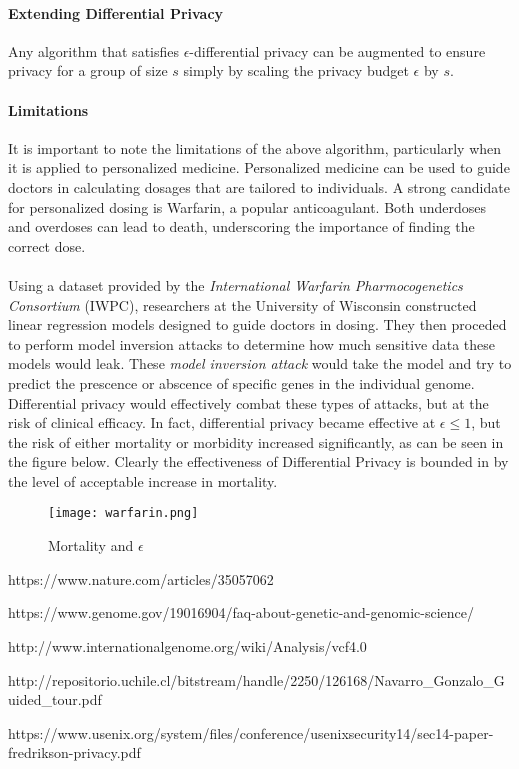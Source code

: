 \paragraph{Extending Differential Privacy}
Any algorithm that satisfies $\epsilon$-differential privacy can be augmented to ensure privacy for a group of size $s$ simply by scaling the privacy budget $\epsilon$ by $s$.

\paragraph{Limitations}

It is important to note the limitations of the above algorithm, particularly when it is applied to personalized medicine. Personalized medicine can be used to guide doctors in calculating dosages that are tailored to individuals. A strong candidate for personalized dosing is Warfarin, a popular anticoagulant. Both underdoses and overdoses can lead to death, underscoring the importance of finding the correct dose.

\paragraph{}
Using a dataset provided by the \textit{International Warfarin Pharmocogenetics Consortium} (IWPC), researchers at the University of Wisconsin constructed linear regression models designed to guide doctors in dosing. They then proceded to perform model inversion attacks to determine how much sensitive data these models would leak. These \textit{model inversion attack} would take the model and try to predict the prescence or abscence of specific genes in the individual genome. Differential privacy would effectively combat these types of attacks, but at the risk of clinical efficacy. In fact, differential privacy became effective at $\epsilon \leq 1$, but the risk of either mortality or morbidity increased significantly, as can be seen in the figure below. Clearly the effectiveness of Differential Privacy is bounded in by the level of acceptable increase in mortality. 

\begin{figure}[h]
\texttt{[image: warfarin.png]}
\centering
\caption{Mortality and $\epsilon$}
\end{figure}

\begin{thebibliography}{5}
  
  https://www.nature.com/articles/35057062

  https://www.genome.gov/19016904/faq-about-genetic-and-genomic-science/

  http://www.internationalgenome.org/wiki/Analysis/vcf4.0
  
  http://repositorio.uchile.cl/bitstream\-/handle/2250/126168/Navarro\_Gonzalo\-\_Guided\_tour.pdf

  https://www.usenix.org/system/files/conference/usenixsecurity14/sec14-paper-fredrikson-privacy.pdf

\end{thebibliography}
